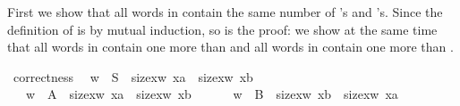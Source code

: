 \begin{isabellebody}
\begin{isamarkuptext}%
\noindent
First we show that all words in  contain the same number of 's and 's. Since the definition of  is by mutual
induction, so is the proof: we show at the same time that all words in
 contain one more  than  and all words in  contain one more  than .%
\end{isamarkuptext}%
\isamarkuptrue%
\isamarkupfalse%
\ correctness{}\isanewline
\ \ {}{}w\ {}\ S\ {}\ size{}x{}w{}\ x{}a{}\ {}\ size{}x{}w{}\ x{}b{}{}\ \ \ \ \ {}\isanewline
\ \ \ {}w\ {}\ A\ {}\ size{}x{}w{}\ x{}a{}\ {}\ size{}x{}w{}\ x{}b{}\ {}\ {}{}\ {}\isanewline
\ \ \ {}w\ {}\ B\ {}\ size{}x{}w{}\ x{}b{}\ {}\ size{}x{}w{}\ x{}a{}\ {}\ {}{}{}%

\end{isabellebody}
